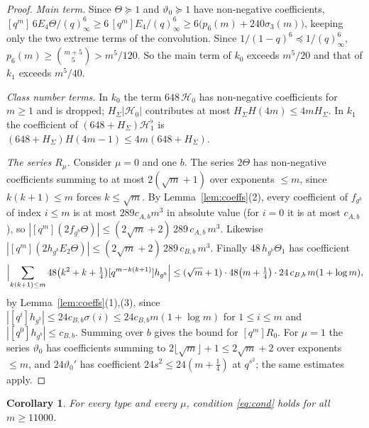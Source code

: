 \documentclass[11pt]{amsart}
\newtheorem{corollary}[theorem]{Corollary}
\theoremstyle{definition}
\newcommand{\vt}{\vartheta}
\newcommand{\cH}{\mathcal H}
\begin{document}
\begin{proof}
\emph{Main term.} Since $\Theta\succeq1$ and $\vt_0\succeq1$ have non-negative coefficients, $[q^m]\,6E_4\Theta/(q)^6_\infty\ge6\,[q^m]E_4/(q)_\infty^6\ge6\bigl(p_6(m)+240\sigma_3(m)\bigr)$, keeping only the two extreme terms of the convolution. Since $1/(1-q)^6\preceq1/(q)_\infty^6$, $p_6(m)\ge\binom{m+5}5>m^5/120$. So the main term of $k_0$ exceeds $m^5/20$ and that of $k_1$ exceeds $m^5/40$.

\emph{Class number terms.} In $k_0$ the term $648\,\cH_0$ has non-negative coefficients for $m\ge1$ and is dropped; $H_\Sigma|\cH_0|$ contributes at most $H_\Sigma H(4m)\le4mH_\Sigma$. In $k_1$ the coefficient of $(648+H_\Sigma)\cH_1^\flat$ is $(648+H_\Sigma)H(4m-1)\le4m(648+H_\Sigma)$.

\emph{The series $R_\mu$.} Consider $\mu=0$ and one $b$. The series $2\Theta$ has non-negative coefficients summing to at most $2(\sqrt m+1)$ over exponents $\le m$, since $k(k+1)\le m$ forces $k\le\sqrt m$. By Lemma~\ref{lem:coeffs}(2), every coefficient of $f_{g^b}$ of index $i\le m$ is at most $289c_{A,b}m^3$ in absolute value (for $i=0$ it is at most $c_{A,b}$), so $|[q^m](2f_{g^b}\Theta)|\le(2\sqrt m+2)\,289\,c_{A,b}\,m^3$. Likewise $|[q^m](2h_{g^b}E_2\Theta)|\le(2\sqrt m+2)\,289\,c_{B,b}\,m^3$. Finally $48\,h_{g^b}\Theta_1$ has coefficient
\[
\Bigl|\sum_{k(k+1)\le m}48\bigl(k^2+k+\tfrac14\bigr)[q^{m-k(k+1)}]h_{g^b}\Bigr|\le(\sqrt m+1)\cdot48\bigl(m+\tfrac14\bigr)\cdot24\,c_{B,b}\,m(1+\log m),
\]
by Lemma~\ref{lem:coeffs}(1),(3), since $|[q^i]h_{g^b}|\le24c_{B,b}\sigma(i)\le24c_{B,b}m(1+\log m)$ for $1\le i\le m$ and $|[q^0]h_{g^b}|\le c_{B,b}$. Summing over $b$ gives the bound for $[q^m]R_0$. For $\mu=1$ the series $\vt_0$ has coefficients summing to $2\lfloor\sqrt m\rfloor+1\le2\sqrt m+2$ over exponents $\le m$, and $24\vt_0'$ has coefficient $24s^2\le24(m+\frac14)$ at $q^{s^2}$; the same estimates apply.
\end{proof}

\begin{corollary}\label{cor:large}
For every type and every $\mu$, condition \eqref{eq:cond} holds for all $m\ge11000$.
\end{corollary}
\end{document}

